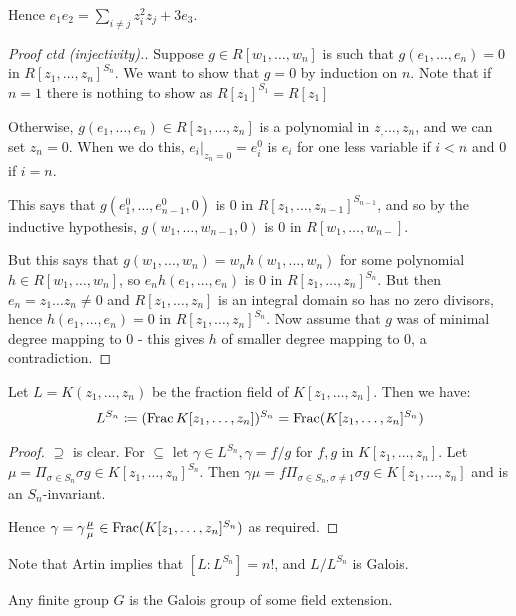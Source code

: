 \documentclass[10pt,a4paper]{article}
\begin{document}
Hence $e_1e_2 = \sum_{i\neq j} z_i^2 z_j + 3 e_3$.
\begin{proof}[Proof ctd (injectivity).]
Suppose $g \in R[w_1, \ldots, w_n]$ is such that $g(e_1, \ldots, e_n) =0$ in $R[z_1, \ldots, z_n]^{S_n}$. We want to show that $g = 0$ by induction on $n$. Note that if $n=1$ there is nothing to show as $R[z_1]^{S_1} = R[z_1]$

Otherwise, $g(e_1, \ldots, e_n) \in R[z_1, \ldots, z_n]$ is a polynomial in $z_, \ldots, z_n$, and we can set $z_n = 0$. When we do this, $e_i|_{z_n = 0} = e_i^0$ is $e_i$ for one less variable if $i<n$ and $0$ if $i = n$.

This says that $g(e_1^0, \ldots, e_{n-1}^0, 0)$ is $0$ in $R[z_1, \ldots, z_{n-1}]^{S_{n-1}}$, and so by the inductive hypothesis, $g(w_1, \ldots, w_{n-1}, 0)$ is 0 in $R[w_1, \ldots, w_{n-}]$.

But this says that $g(w_1, \ldots, w_n) = w_n h(w_1, \ldots, w_n)$ for some polynomial $h \in R[w_1, \ldots, w_n]$, so $e_n h(e_1, \ldots, e_n)$ is $0$ in $R[z_1, \ldots, z_n]^{S_n}$. But then $e_n = z_1 \ldots z_n \neq 0$ and $R[z_1, \ldots, z_n]$ is an integral domain so has no zero divisors, hence $h(e_1, \ldots, e_n) = 0$ in $R[z_1, \ldots, z_n]^{S_n}$. Now assume that $g$ was of minimal degree mapping to 0 - this gives $h$ of smaller degree mapping to 0, a contradiction.
\end{proof}
\begin{lemma}
Let $L = K(z_1, \ldots, z_n)$ be the fraction field of $K[z_1, \ldots, z_n]$. Then we have:
\begin{align*}
L^{S_n} \coloneqq (\operatorname{Frac} K[z_1, \ldots, z_n])^{S_n} = \operatorname{Frac} (K[z_1, \ldots, z_n]^{S_n})
\end{align*}
\end{lemma}
\begin{proof}
$\supseteq$ is clear. For $\subseteq$ let $\gamma \in L^{S_n}, \gamma=  f/g$ for $f, g$ in $K[z_1, \ldots, z_n]$. Let $\mu  = \Pi_{\sigma \in S_n} \sigma g \in K[z_1, \ldots, z_n]^{S_n}$. Then $\gamma \mu = f \Pi_{\sigma \in S_n, \sigma \neq 1} \sigma g \in K[z_1, \ldots, z_n]$ and is an $S_n$-invariant.

Hence $\gamma=  \gamma \frac{\mu}{\mu} \in \operatorname{Frac}(K[z_1, \ldots, z_n]^{S_n})$ as required.
\end{proof}
Note that Artin implies that $[L:L^{S_n}] = n!$, and $L/L^{S_n}$ is Galois.
\begin{corollary}
Any finite group $G$ is the Galois group of some field extension.
\end{corollary}
\end{document}
